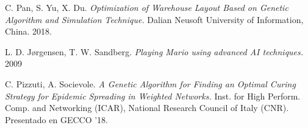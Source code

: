 
\begin{thebibliography}{9}
C. Pan, S. Yu, X. Du.
\textit{Optimization of Warehouse Layout Based on Genetic Algorithm and Simulation Technique.}
Dalian Neusoft University of Information, China. 2018.

L. D. Jørgensen, T. W. Sandberg.
\textit{Playing Mario using advanced AI techniques.}
2009

C. Pizzuti, A. Socievole.
\textit{A Genetic Algorithm for Finding an Optimal Curing Strategy for Epidemic Spreading in Weighted Networks.}
Inst. for High Perform. Comp. and Networking (ICAR), National Research Council of Italy (CNR). Presentado en GECCO ’18.
\end{thebibliography}

